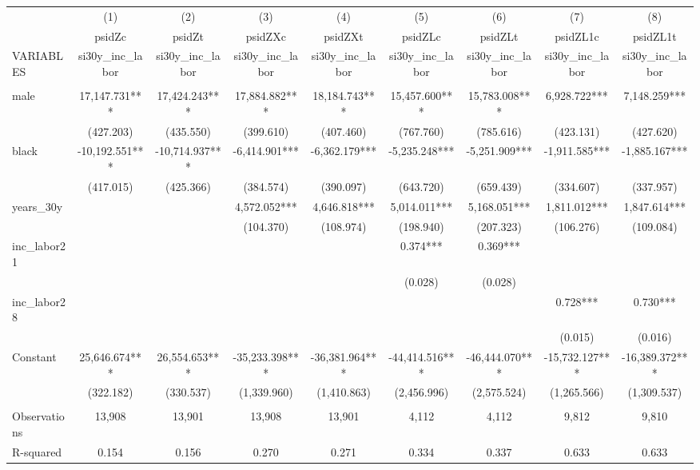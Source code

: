 \begin{tabular}{lcccccccc} \hline
 & (1) & (2) & (3) & (4) & (5) & (6) & (7) & (8) \\
 & psidZc & psidZt & psidZXc & psidZXt & psidZLc & psidZLt & psidZL1c & psidZL1t \\
VARIABLES & si30y\_inc\_labor & si30y\_inc\_labor & si30y\_inc\_labor & si30y\_inc\_labor & si30y\_inc\_labor & si30y\_inc\_labor & si30y\_inc\_labor & si30y\_inc\_labor \\ \hline
 &  &  &  &  &  &  &  &  \\
male & 17,147.731*** & 17,424.243*** & 17,884.882*** & 18,184.743*** & 15,457.600*** & 15,783.008*** & 6,928.722*** & 7,148.259*** \\
 & (427.203) & (435.550) & (399.610) & (407.460) & (767.760) & (785.616) & (423.131) & (427.620) \\
black & -10,192.551*** & -10,714.937*** & -6,414.901*** & -6,362.179*** & -5,235.248*** & -5,251.909*** & -1,911.585*** & -1,885.167*** \\
 & (417.015) & (425.366) & (384.574) & (390.097) & (643.720) & (659.439) & (334.607) & (337.957) \\
years\_30y &  &  & 4,572.052*** & 4,646.818*** & 5,014.011*** & 5,168.051*** & 1,811.012*** & 1,847.614*** \\
 &  &  & (104.370) & (108.974) & (198.940) & (207.323) & (106.276) & (109.084) \\
inc\_labor21 &  &  &  &  & 0.374*** & 0.369*** &  &  \\
 &  &  &  &  & (0.028) & (0.028) &  &  \\
inc\_labor28 &  &  &  &  &  &  & 0.728*** & 0.730*** \\
 &  &  &  &  &  &  & (0.015) & (0.016) \\
Constant & 25,646.674*** & 26,554.653*** & -35,233.398*** & -36,381.964*** & -44,414.516*** & -46,444.070*** & -15,732.127*** & -16,389.372*** \\
 & (322.182) & (330.537) & (1,339.960) & (1,410.863) & (2,456.996) & (2,575.524) & (1,265.566) & (1,309.537) \\
 &  &  &  &  &  &  &  &  \\
Observations & 13,908 & 13,901 & 13,908 & 13,901 & 4,112 & 4,112 & 9,812 & 9,810 \\
 R-squared & 0.154 & 0.156 & 0.270 & 0.271 & 0.334 & 0.337 & 0.633 & 0.633 \\ \hline
\end{tabular}
